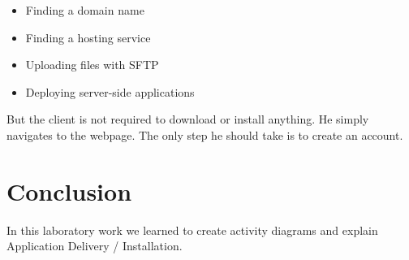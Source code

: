 \documentclass[12pt,a4paper,titlepage]{article}
\begin{document}
\begin{itemize}
	\item
	Finding a domain name
\item
	Finding a hosting service
\item
	Uploading files with SFTP
	\item 
	Deploying server-side applications
\end{itemize}

But the client is not required to download or install anything. He simply navigates to the webpage. The only step he should take is to create an account.

\section{Conclusion}
In this laboratory work we learned to create activity diagrams and explain Application Delivery / Installation.

\clearpage
\cleardoublepage
\end{document}
